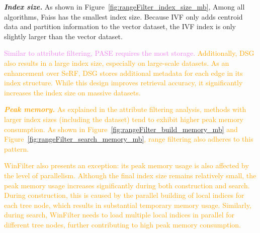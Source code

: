 \documentclass[sigconf, nonacm]{acmart}
\begin{document}
{	
	
	\textit{\textbf{Index size.}} 
	As shown in Figure~\ref{fig:rangeFilter_index_size_mb}, Among all algorithms, Faiss has the smallest index size. Because IVF only adds centroid data and partition information to the vector dataset, the IVF index is only slightly larger than the vector dataset.

	
	\textcolor{violet}{Similar to attribute filtering, PASE requires the most storage. }
	\textcolor{orange}{Additionally, DSG also results in a large index size, especially on large-scale datasets. As an enhancement over SeRF, DSG stores additional metadata for each edge in its index structure. While this design improves retrieval accuracy, it significantly increases the index size on massive datasets.}
	
	
	\textcolor{orange}{\textit{\textbf{Peak memory.}}  
	As explained in the attribute filtering analysis, methods with larger index sizes (including the dataset) tend to exhibit higher peak memory consumption. As shown in Figure~\ref{fig:rangeFilter_build_memory_mb} and Figure~\ref{fig:rangeFilter_search_memory_mb}, range filtering also adheres to this pattern.}  

	\textcolor{orange}{WinFilter also presents an exception:  its peak memory usage is also affected by the level of parallelism. Although the final index size remains relatively small, the peak memory usage increases significantly during both construction and search. During construction, this is caused by the parallel building of local indices for each tree node, which results in substantial temporary memory usage. Similarly, during search, WinFilter needs to load multiple local indices in parallel for different tree nodes, further contributing to high peak memory consumption.}
	

}
\end{document}
